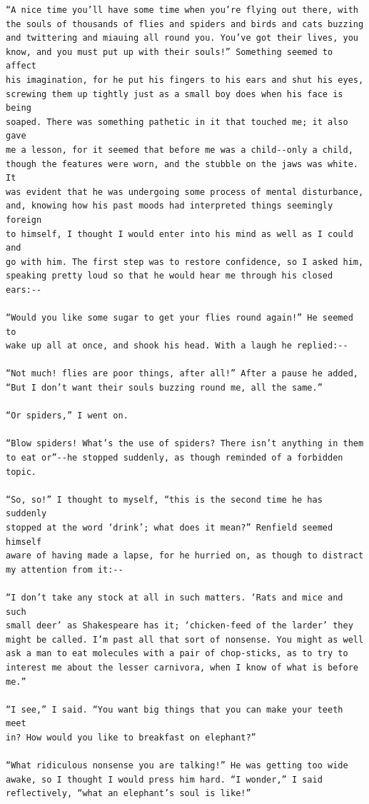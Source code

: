 \documentclass{article}
\begin{document}
\begin{verbatim}
“A nice time you’ll have some time when you’re flying out there, with
the souls of thousands of flies and spiders and birds and cats buzzing
and twittering and miauing all round you. You’ve got their lives, you
know, and you must put up with their souls!” Something seemed to affect
his imagination, for he put his fingers to his ears and shut his eyes,
screwing them up tightly just as a small boy does when his face is being
soaped. There was something pathetic in it that touched me; it also gave
me a lesson, for it seemed that before me was a child--only a child,
though the features were worn, and the stubble on the jaws was white. It
was evident that he was undergoing some process of mental disturbance,
and, knowing how his past moods had interpreted things seemingly foreign
to himself, I thought I would enter into his mind as well as I could and
go with him. The first step was to restore confidence, so I asked him,
speaking pretty loud so that he would hear me through his closed ears:--

“Would you like some sugar to get your flies round again!” He seemed to
wake up all at once, and shook his head. With a laugh he replied:--

“Not much! flies are poor things, after all!” After a pause he added,
“But I don’t want their souls buzzing round me, all the same.”

“Or spiders,” I went on.

“Blow spiders! What’s the use of spiders? There isn’t anything in them
to eat or”--he stopped suddenly, as though reminded of a forbidden
topic.

“So, so!” I thought to myself, “this is the second time he has suddenly
stopped at the word ‘drink’; what does it mean?” Renfield seemed himself
aware of having made a lapse, for he hurried on, as though to distract
my attention from it:--

“I don’t take any stock at all in such matters. ‘Rats and mice and such
small deer’ as Shakespeare has it; ‘chicken-feed of the larder’ they
might be called. I’m past all that sort of nonsense. You might as well
ask a man to eat molecules with a pair of chop-sticks, as to try to
interest me about the lesser carnivora, when I know of what is before
me.”

“I see,” I said. “You want big things that you can make your teeth meet
in? How would you like to breakfast on elephant?”

“What ridiculous nonsense you are talking!” He was getting too wide
awake, so I thought I would press him hard. “I wonder,” I said
reflectively, “what an elephant’s soul is like!”


\end{verbatim}
\end{document}
